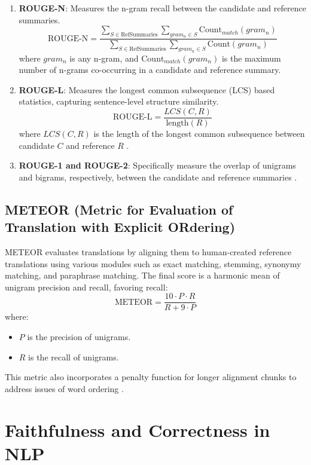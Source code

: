 \begin{enumerate}
    \item \textbf{ROUGE-N}: Measures the n-gram recall between the candidate and reference summaries.
    \[
    \text{ROUGE-N} = \frac{\sum_{S \in \text{RefSummaries}} \sum_{gram_n \in S} \text{Count}_{match}(gram_n)}{\sum_{S \in \text{RefSummaries}} \sum_{gram_n \in S} \text{Count}(gram_n)}
    \]
    where \( gram_n \) is any n-gram, and \( \text{Count}_{match}(gram_n) \) is the maximum number of n-grams co-occurring in a candidate and reference summary.

    \item \textbf{ROUGE-L}: Measures the longest common subsequence (LCS) based statistics, capturing sentence-level structure similarity.
    \[
    \text{ROUGE-L} = \frac{LCS(C, R)}{\text{length}(R)}
    \]
    where \( LCS(C, R) \) is the length of the longest common subsequence between candidate \( C \) and reference \( R \) \cite{Ng2015Better}.

    \item \textbf{ROUGE-1 and ROUGE-2}: Specifically measure the overlap of unigrams and bigrams, respectively, between the candidate and reference summaries \cite{Ganesan2015ROUGE}.
\end{enumerate}

\subsection{METEOR (Metric for Evaluation of Translation with Explicit ORdering)}

METEOR evaluates translations by aligning them to human-created reference translations using various modules such as exact matching, stemming, synonymy matching, and paraphrase matching. The final score is a harmonic mean of unigram precision and recall, favoring recall:
\[
\text{METEOR} = \frac{10 \cdot P \cdot R}{R + 9 \cdot P}
\]
where:
\begin{itemize}
    \item \( P \) is the precision of unigrams.
    \item \( R \) is the recall of unigrams.
\end{itemize}

This metric also incorporates a penalty function for longer alignment chunks to address issues of word ordering \cite{Agarwal2008Meteor}.

\section{Faithfulness and Correctness in NLP}

